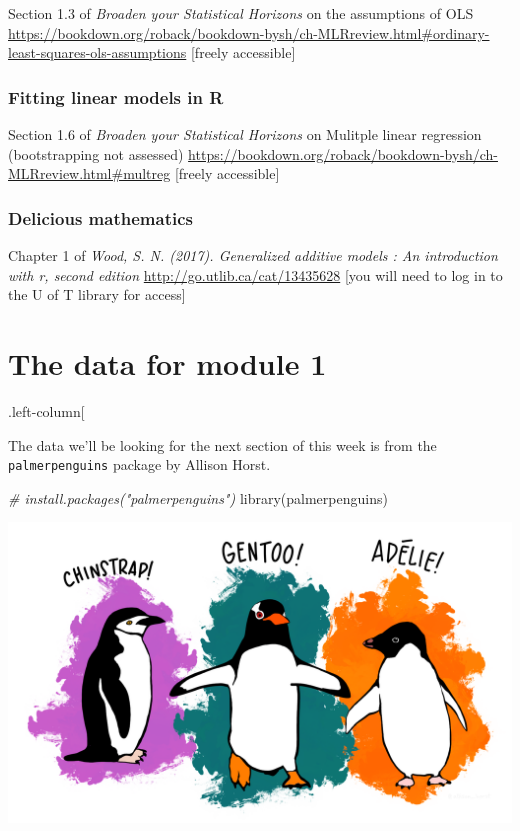 \documentclass[
  openany]{book}
\newenvironment{Shaded}{\begin{snugshade}}{\end{snugshade}}
\newcommand{\CommentTok}[1]{\textcolor[rgb]{0.56,0.35,0.01}{\textit{#1}}}
\newcommand{\FunctionTok}[1]{\textcolor[rgb]{0.00,0.00,0.00}{#1}}
\newcommand{\NormalTok}[1]{#1}
\begin{document}
Section 1.3 of \emph{Broaden your Statistical Horizons} on the assumptions of OLS
\url{https://bookdown.org/roback/bookdown-bysh/ch-MLRreview.html\#ordinary-least-squares-ols-assumptions}
{[}freely accessible{]}

\hypertarget{fitting-linear-models-in-r}{%
\subsubsection{Fitting linear models in R}\label{fitting-linear-models-in-r}}

Section 1.6 of \emph{Broaden your Statistical Horizons} on Mulitple linear regression (bootstrapping not assessed) \url{https://bookdown.org/roback/bookdown-bysh/ch-MLRreview.html\#multreg} {[}freely accessible{]}

\hypertarget{delicious-mathematics}{%
\subsubsection{Delicious mathematics}\label{delicious-mathematics}}

Chapter 1 of \emph{Wood, S. N. (2017). Generalized additive models : An introduction with r, second edition}
\url{http://go.utlib.ca/cat/13435628} {[}you will need to log in to the U of T library for access{]}

\hypertarget{the-data-for-module-1}{%
\section{The data for module 1}\label{the-data-for-module-1}}

.left-column{[}

The data we'll be looking for the next section of this week is from the \texttt{palmerpenguins} package by Allison Horst.

\begin{Shaded}
\begin{Highlighting}[]
\CommentTok{\# install.packages("palmerpenguins")}
\FunctionTok{library}\NormalTok{(palmerpenguins)}
\end{Highlighting}
\end{Shaded}

\begin{center}\includegraphics[width=0.7\linewidth]{images/m1/lter_penguins} \end{center}
\end{document}
